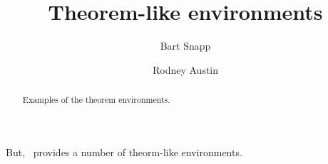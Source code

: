 \documentclass{ximera}
\author{Bart Snapp \and Rodney Austin}
\title{Theorem-like environments}
\begin{document}
\begin{abstract}
  Examples of the theorem environments.
\end{abstract}
\maketitle


But, \ximera\ provides a number of theorm-like environments.

\begin{theorem}
 \lipsum[1][1-3]
\end{theorem}


\begin{theorem}[My theorem]
  \lipsum[1][1-3]
\end{theorem}

\begin{algorithm}
  \lipsum[1][1-3]
\end{algorithm}

\begin{axiom}
  \lipsum[1][1-3]
\end{axiom}

\begin{claim}
  \lipsum[1][1-3]
\end{claim}

\begin{conclusion}
  \lipsum[1][1-3]
\end{conclusion}

\begin{condition}
  \lipsum[1][1-3]
\end{condition}

\begin{conjecture}
  \lipsum[1][1-3]
\end{conjecture}

\begin{corollary}
  \lipsum[1][1-3]
\end{corollary}

\begin{criterion}
  \lipsum[1][1-3]
\end{criterion}

\begin{definition}
  \lipsum[1][1-3]
\end{definition}

\begin{example}
  \lipsum[1][1-3]
\end{example}

\begin{explanation}
  \lipsum[1][1-3]
\end{explanation}
\end{document}
